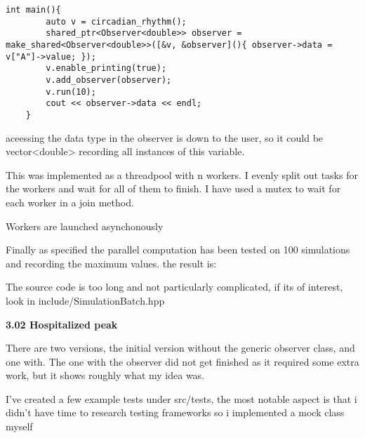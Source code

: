 \begin{lstlisting}[style=colorC++]
    int main(){
        auto v = circadian_rhythm();
        shared_ptr<Observer<double>> observer = make_shared<Observer<double>>([&v, &observer](){ observer->data = v["A"]->value; });
        v.enable_printing(true);
        v.add_observer(observer);
        v.run(10);
        cout << observer->data << endl;
    }
\end{lstlisting}

aceessing the data type in the observer is down to the user, so it could be vector<double> recording all instances of this variable.

This was implemented as a threadpool with n workers. I evenly split out tasks for the workers and wait for all of them to finish. I have used a mutex to wait for each worker in a join method. 

Workers are launched asynchonously

Finally as specified the parallel computation has been tested on 100 simulations and recording the maximum values. the result is:

The source code is too long and not particularly complicated, if its of interest, look in include/SimulationBatch.hpp

\textbf{3.02 Hospitalized peak}

There are two versions, the initial version without the generic observer class, and one with. The one with the observer did not get finished as it required some extra work, but it shows roughly what my idea was.


I've created a few example tests under src/tests, the most notable aspect is that i didn't have time to research testing frameworks so i implemented a mock class myself

